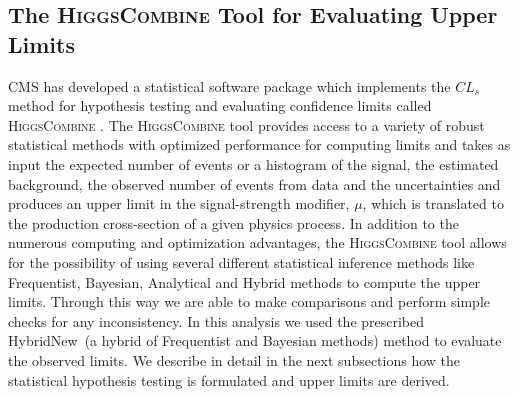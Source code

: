 \subsection{The \textsc{HiggsCombine} Tool for Evaluating Upper Limits}
CMS has developed a statistical software package which implements the $CL_{s}$ method for hypothesis testing and evaluating confidence limits called \textsc{HiggsCombine} \cite{LIMITS}. The  \textsc{HiggsCombine} tool provides access to a variety of robust statistical methods with optimized performance for computing limits and takes as input the expected number of events or a histogram of the signal, the estimated background, the observed number of events from data and the uncertainties and produces an upper limit in the signal-strength modifier, $\mu$, which is translated to the production cross-section of a given physics process. In addition to the numerous computing and optimization advantages, the \textsc{HiggsCombine} tool allows for the possibility of using several different statistical inference methods like Frequentist, Bayesian, Analytical and Hybrid methods to compute the upper limits. Through this way we  are able to make comparisons and perform simple checks for any inconsistency. In this analysis we used the prescribed HybridNew~(a hybrid of Frequentist and Bayesian methods) method to evaluate the observed  limits. We describe in detail in the next subsections how the statistical hypothesis testing is formulated and upper limits are derived.

